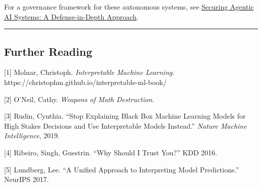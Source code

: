 \documentclass[
  letterpaper,
  DIV=11,
  numbers=noendperiod]{scrartcl}
\begin{document}
For a governance framework for these autonomous systems, see
\href{https://changezakram.github.io/agentic-ai/agentic_ai_security.html}{Securing
Agentic AI Systems: A Defense-in-Depth Approach}.

\begin{center}\rule{0.5\linewidth}{0.5pt}\end{center}

\subsection{Further Reading}\label{further-reading}

{[}1{]} Molnar, Christoph. \emph{Interpretable Machine Learning}.
https://christophm.github.io/interpretable-ml-book/

{[}2{]} O'Neil, Cathy. \emph{Weapons of Math Destruction}.

{[}3{]} Rudin, Cynthia. ``Stop Explaining Black Box Machine Learning
Models for High Stakes Decisions and Use Interpretable Models Instead.''
\emph{Nature Machine Intelligence}, 2019.

{[}4{]} Ribeiro, Singh, Guestrin. ``Why Should I Trust You?'' KDD 2016.

{[}5{]} Lundberg, Lee. ``A Unified Approach to Interpreting Model
Predictions.'' NeurIPS 2017.
\end{document}

